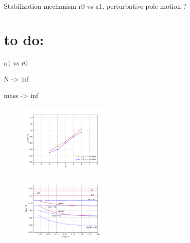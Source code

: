 \documentclass[aps,nofootinbib,prl,showpacs,twocolumn,groupedaddress,superscriptaddress]
{revtex4}
\begin{document}
Stabilization mechanism r0 vs a1, 
perturbative pole motion ?

\section{to do:}
a1 vs r0

N -> inf

mass -> inf

\begin{figure}[htb] 
\begin{center} 
\includegraphics[width=0.4\textwidth]{Graf/Lc-vs-N.pdf}
\caption{}
\label{fig:fig1}
\end{center} 
\end{figure}

\begin{figure}[htb] 
\begin{center} 
\includegraphics[width=0.4\textwidth]{Graf/E3b15-thresholds.pdf}
\caption{}
\label{fig:fig2}
\end{center} 
\end{figure}

\newpage
\end{document}
